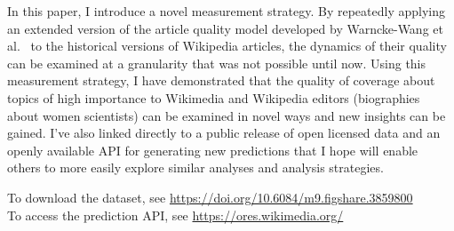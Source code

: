 In this paper, I introduce a novel measurement strategy.  By repeatedly applying an extended version of the article quality model developed by Warncke-Wang et al.~\cite{wang13tell} to the historical versions of Wikipedia articles, the dynamics of their quality can be examined at a granularity that was not possible until now.  Using this measurement strategy, I have demonstrated that the quality of coverage about topics of high importance to Wikimedia and Wikipedia editors (biographies about women scientists) can be examined in novel ways and new insights can be gained.  I've also linked directly to a public release of open licensed data and an openly available API for generating new predictions that I hope will enable others to more easily explore similar analyses and analysis strategies.

To download the dataset, see \url{https://doi.org/10.6084/m9.figshare.3859800}\\
To access the prediction API, see \url{https://ores.wikimedia.org/}
